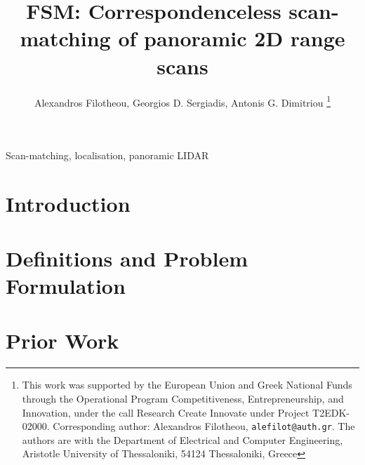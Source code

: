 \documentclass[letterpaper, 10 pt, conference]{ieeeconf}
\begin{document}
\title{\LARGE \bf FSM: Correspondenceless scan-matching of panoramic 2D range scans}


\author{Alexandros Filotheou, Georgios D. Sergiadis, Antonis G. Dimitriou%
  \thanks{This work was supported by the European Union and Greek National Funds
  through the Operational Program Competitiveness, Entrepreneurship, and
  Innovation, under the call Research Create Innovate under Project T2EDK-02000.
  Corresponding author: Alexandros Filotheou, {\tt\small alefilot@auth.gr}.
  The authors are with the Department of Electrical and Computer Engineering,
  Aristotle University of Thessaloniki, 54124 Thessaloniki, Greece}
}

\maketitle
\thispagestyle{empty}
\pagestyle{empty}


\begin{abstract}
  
\end{abstract}

\begin{keywords}
Scan-matching, localisation, panoramic LIDAR
\end{keywords}

\section{Introduction}
  

\section{Definitions and Problem Formulation}
  \label{section:definitions_and_problem_formulation}
  

\section{Prior Work}
  \label{section:sota}
  
\end{document}
